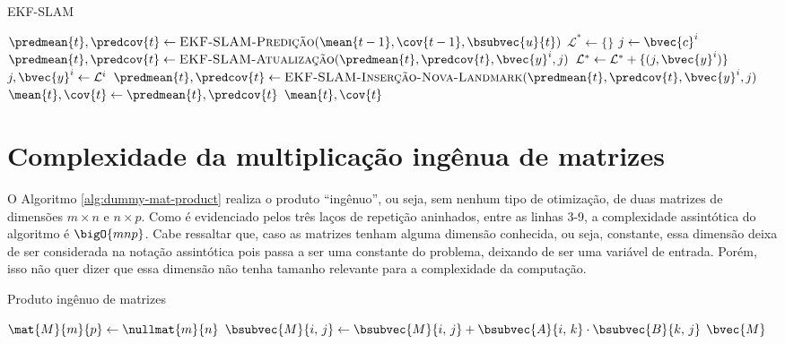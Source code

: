 \begin{algorithm}[h]
  \caption{EKF-SLAM}
  \label{alg:ekf-slam-full}
\begin{algorithmic}[1]
    \State $\predmean{t}, \predcov{t} \gets \textproc{EKF-SLAM-Predição}(\mean{t-1}, \cov{t-1}, \bsubvec{u}{t})$
    \State $\mathcal{L}^{*} \gets \{\}$ 
      \State $j \gets \bvec{c}^i$
        \State $\predmean{t}, \predcov{t} \gets \textproc{EKF-SLAM-Atualização}(\predmean{t}, \predcov{t}, \bvec{y}^i, j)$
      \Else
        \State $\mathcal{L}^* \gets \mathcal{L}^* + \{(j, \bvec{y}^i)\}$
      \EndIf
    \EndFor
      \State $j, \bvec{y}^i \gets \mathcal{L}^i$
      \State $\predmean{t}, \predcov{t} \gets \textproc{EKF-SLAM-Inserção-Nova-Landmark}(\predmean{t}, \predcov{t}, \bvec{y}^i, j)$
    \EndFor
    \State $\mean{t}, \cov{t} \gets \predmean{t}, \predcov{t}$
    \State \Return $\mean{t}, \cov{t}$
  \EndProcedure
\end{algorithmic}
\end{algorithm}

\clearpage

\section{Complexidade da multiplicação ingênua de matrizes}
\label{app:matrix-product-analysis}
O Algoritmo \ref{alg:dummy-mat-product} realiza o produto ``ingênuo'', ou seja, sem nenhum tipo de otimização, de duas matrizes de dimensões $m\times n$ e $n\times p$. Como é evidenciado pelos três laços de 
repetição aninhados, entre as linhas 3-9, a complexidade assintótica do algoritmo é $\bigO{mnp}$. Cabe ressaltar que, caso as matrizes tenham 
alguma dimensão conhecida, ou seja, constante, essa dimensão deixa 
de ser considerada na notação assintótica pois passa a ser uma constante do problema, deixando de ser uma variável de entrada. Porém, isso não quer dizer que essa dimensão não tenha tamanho relevante para a complexidade da 
computação.
\begin{algorithm}
  \caption{Produto ingênuo de matrizes}
  \label{alg:dummy-mat-product}
\begin{algorithmic}[1]
\State $\mat{M}{m}{p} \gets \nullmat{m}{n}$
      \State $\bsubvec{M}{i,\, j} \gets \bsubvec{M}{i,\,j} + \bsubvec{A}{i,\,k} \cdot \bsubvec{B}{k,\,j}$
    \EndFor
  \EndFor
\EndFor
\State \Return $\bvec{M}$
\EndProcedure
\end{algorithmic}
\end{algorithm}